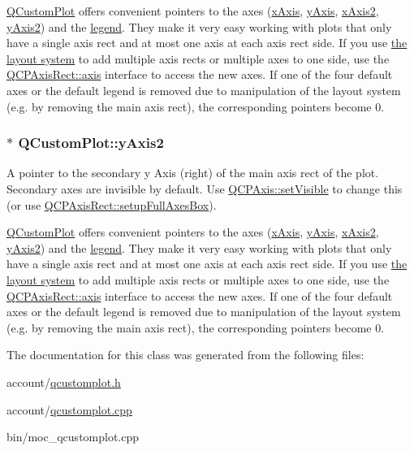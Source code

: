 \hyperlink{classQCustomPlot}{\-Q\-Custom\-Plot} offers convenient pointers to the axes (\hyperlink{classQCustomPlot_a9a79cd0158a4c7f30cbc702f0fd800e4}{x\-Axis}, \hyperlink{classQCustomPlot_af6fea5679725b152c14facd920b19367}{y\-Axis}, \hyperlink{classQCustomPlot_ada41599f22cad901c030f3dcbdd82fd9}{x\-Axis2}, \hyperlink{classQCustomPlot_af13fdc5bce7d0fabd640f13ba805c0b7}{y\-Axis2}) and the \hyperlink{classQCustomPlot_a4eadcd237dc6a09938b68b16877fa6af}{legend}. \-They make it very easy working with plots that only have a single axis rect and at most one axis at each axis rect side. \-If you use \hyperlink{}{the layout system} to add multiple axis rects or multiple axes to one side, use the \hyperlink{classQCPAxisRect_a560de44e47a4af0f86c59102a094b1e4}{\-Q\-C\-P\-Axis\-Rect\-::axis} interface to access the new axes. \-If one of the four default axes or the default legend is removed due to manipulation of the layout system (e.\-g. by removing the main axis rect), the corresponding pointers become 0. \hypertarget{classQCustomPlot_af13fdc5bce7d0fabd640f13ba805c0b7}{
\subsubsection[{y\-Axis2}]{ $\ast$ {\bf \-Q\-Custom\-Plot\-::y\-Axis2}}}\label{classQCustomPlot_af13fdc5bce7d0fabd640f13ba805c0b7}
\-A pointer to the secondary y \-Axis (right) of the main axis rect of the plot. \-Secondary axes are invisible by default. \-Use \hyperlink{classQCPLayerable_a3bed99ddc396b48ce3ebfdc0418744f8}{\-Q\-C\-P\-Axis\-::set\-Visible} to change this (or use \hyperlink{classQCPAxisRect_a5fa906175447b14206954f77fc7f1ef4}{\-Q\-C\-P\-Axis\-Rect\-::setup\-Full\-Axes\-Box}).

\hyperlink{classQCustomPlot}{\-Q\-Custom\-Plot} offers convenient pointers to the axes (\hyperlink{classQCustomPlot_a9a79cd0158a4c7f30cbc702f0fd800e4}{x\-Axis}, \hyperlink{classQCustomPlot_af6fea5679725b152c14facd920b19367}{y\-Axis}, \hyperlink{classQCustomPlot_ada41599f22cad901c030f3dcbdd82fd9}{x\-Axis2}, \hyperlink{classQCustomPlot_af13fdc5bce7d0fabd640f13ba805c0b7}{y\-Axis2}) and the \hyperlink{classQCustomPlot_a4eadcd237dc6a09938b68b16877fa6af}{legend}. \-They make it very easy working with plots that only have a single axis rect and at most one axis at each axis rect side. \-If you use \hyperlink{}{the layout system} to add multiple axis rects or multiple axes to one side, use the \hyperlink{classQCPAxisRect_a560de44e47a4af0f86c59102a094b1e4}{\-Q\-C\-P\-Axis\-Rect\-::axis} interface to access the new axes. \-If one of the four default axes or the default legend is removed due to manipulation of the layout system (e.\-g. by removing the main axis rect), the corresponding pointers become 0. 

\-The documentation for this class was generated from the following files\-:\begin{DoxyCompactItemize}
\item 
account/\hyperlink{qcustomplot_8h}{qcustomplot.\-h}\item 
account/\hyperlink{qcustomplot_8cpp}{qcustomplot.\-cpp}\item 
bin/moc\-\_\-qcustomplot.\-cpp\end{DoxyCompactItemize}
